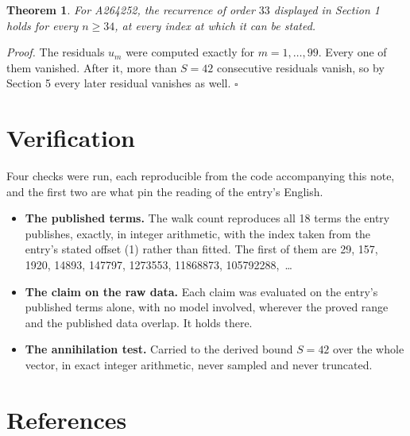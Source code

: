 \documentclass[11pt]{article}
\newtheorem{theorem}{Theorem}
\theoremstyle{definition}
\begin{document}
\begin{theorem} For A264252, the recurrence of order $33$ displayed in Section 1 holds for every $n \ge 34$, at every index at which it can be stated.\end{theorem}

{\itshape Proof.} The residuals $u_m$ were computed exactly for $m = 1,\dots,99$. Every one of them vanished. After it, more than $S = 42$ consecutive residuals vanish, so by Section 5 every later residual vanishes as well. $\square$

\section{Verification}

Four checks were run, each reproducible from the code accompanying this note, and the first two are what pin the reading of the entry's English.

\begin{itemize}

\item {\bfseries The published terms.} The walk count reproduces all 18 terms the entry publishes, exactly, in integer arithmetic, with the index taken from the entry's stated offset (1) rather than fitted. The first of them are 29, 157, 1920, 14893, 147797, 1273553, 11868873, 105792288,~\dots

\item {\bfseries The claim on the raw data.} Each claim was evaluated on the entry's published terms alone, with no model involved, wherever the proved range and the published data overlap. It holds there.

\item {\bfseries The annihilation test.} Carried to the derived bound $S = 42$ over the whole vector, in exact integer arithmetic, never sampled and never truncated.

\end{itemize}

\section{References}
\end{document}
